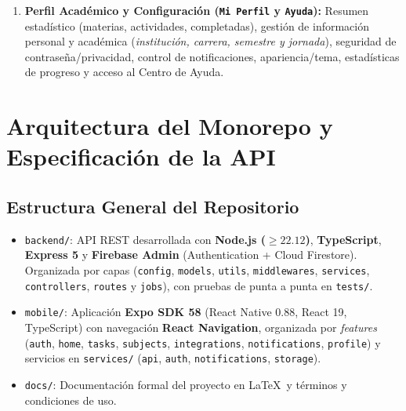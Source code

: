 \documentclass[11pt,letterpaper]{article}
\begin{document}
\begin{enumerate}[leftmargin=1.5em, itemsep=4pt]
  \item \textbf{Perfil Académico y Configuración (\texttt{Mi Perfil} y \texttt{Ayuda}):}
  Resumen estadístico (materias, actividades, completadas), gestión de información personal y académica (\emph{institución, carrera, semestre y jornada}), seguridad de contraseña/privacidad, control de notificaciones, apariencia/tema, estadísticas de progreso y acceso al Centro de Ayuda.
\end{enumerate}

\section{Arquitectura del Monorepo y Especificación de la API}

\subsection{Estructura General del Repositorio}
\begin{itemize}[leftmargin=1.5em, itemsep=2pt]
  \item \texttt{backend/}: API REST desarrollada con \textbf{Node.js ($\ge 22.12$)}, \textbf{TypeScript}, \textbf{Express 5} y \textbf{Firebase Admin} (Authentication + Cloud Firestore). Organizada por capas (\texttt{config}, \texttt{models}, \texttt{utils}, \texttt{middlewares}, \texttt{services}, \texttt{controllers}, \texttt{routes} y \texttt{jobs}), con pruebas de punta a punta en \texttt{tests/}.
  \item \texttt{mobile/}: Aplicación \textbf{Expo SDK 58} (React Native 0.88, React 19, TypeScript) con navegación \textbf{React Navigation}, organizada por \emph{features} (\texttt{auth}, \texttt{home}, \texttt{tasks}, \texttt{subjects}, \texttt{integrations}, \texttt{notifications}, \texttt{profile}) y servicios en \texttt{services/} (\texttt{api}, \texttt{auth}, \texttt{notifications}, \texttt{storage}).
  \item \texttt{docs/}: Documentación formal del proyecto en \LaTeX\ y términos y condiciones de uso.
\end{itemize}
\end{document}
